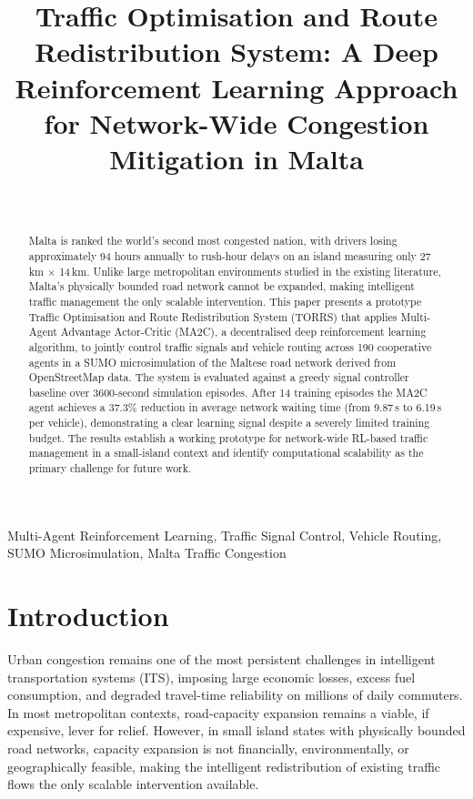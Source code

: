\documentclass[conference]{IEEEtran}
\title{Traffic Optimisation and Route Redistribution System: A Deep Reinforcement Learning Approach for Network-Wide Congestion Mitigation in Malta}
\author{
\IEEEauthorblockN{Kyle Austin}\\
\IEEEauthorblockA{
B.Sc. (Hons.) Applied Data Science / Software Development\\
MCAST Institute of Information and Communication Technology\\
Malta\\
Kyle.austin.h63676@mcast.edu.mt}
}
\begin{document}
\maketitle

\begin{abstract}
Malta is ranked the world's second most congested nation, with drivers losing
approximately 94 hours annually to rush-hour delays on an island measuring only
27\,km $\times$ 14\,km. Unlike large metropolitan environments studied in the
existing literature, Malta's physically bounded road network cannot be expanded,
making intelligent traffic management the only scalable intervention.
This paper presents a prototype Traffic Optimisation and Route Redistribution
System (TORRS) that applies Multi-Agent Advantage Actor-Critic (MA2C), a
decentralised deep reinforcement learning algorithm, to jointly control traffic
signals and vehicle routing across 190 cooperative agents in a SUMO
microsimulation of the Maltese road network derived from OpenStreetMap data.
The system is evaluated against a greedy signal controller baseline over
3600-second simulation episodes.
After 14 training episodes the MA2C agent achieves a 37.3\% reduction in
average network waiting time (from 9.87\,s to 6.19\,s per vehicle), demonstrating
a clear learning signal despite a severely limited training budget.
The results establish a working prototype for network-wide RL-based traffic
management in a small-island context and identify computational scalability as
the primary challenge for future work.
\end{abstract}

\begin{IEEEkeywords}
Multi-Agent Reinforcement Learning, Traffic Signal Control, Vehicle Routing,
SUMO Microsimulation, Malta Traffic Congestion
\end{IEEEkeywords}

\section{Introduction}

Urban congestion remains one of the most persistent challenges in intelligent
transportation systems (ITS), imposing large economic losses, excess fuel
consumption, and degraded travel-time reliability on millions of daily commuters.
In most metropolitan contexts, road-capacity expansion remains a viable, if
expensive, lever for relief. However, in small island states with physically
bounded road networks, capacity expansion is not financially, environmentally,
or geographically feasible, making the intelligent redistribution of existing
traffic flows the only scalable intervention available.
\end{document}
